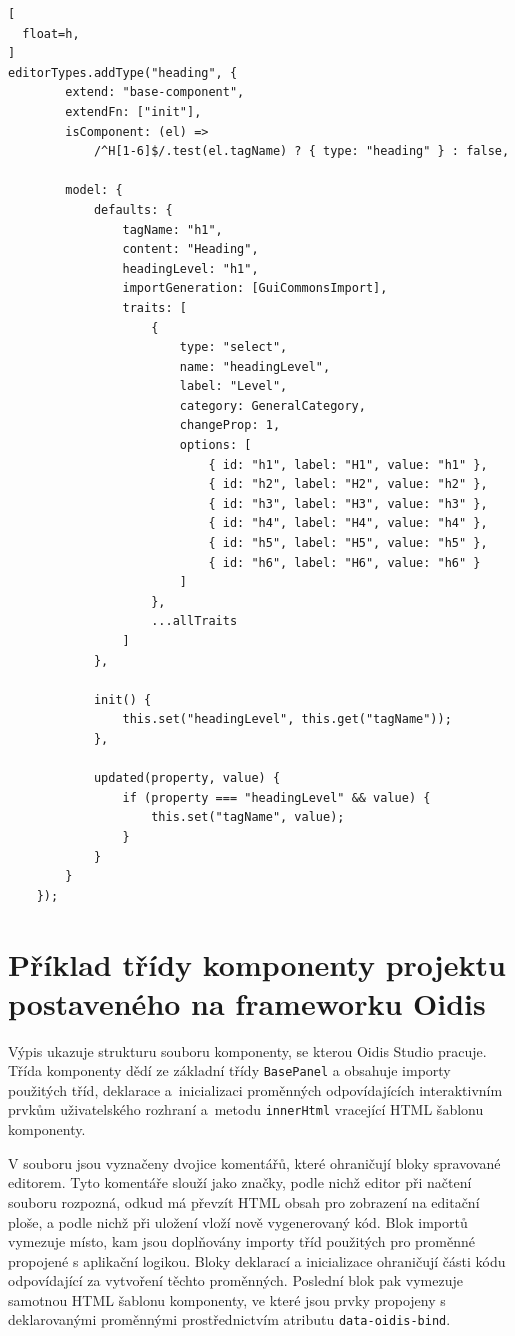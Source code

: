 \begin{lstlisting}[
  float=h,
]
editorTypes.addType("heading", {
        extend: "base-component",
        extendFn: ["init"],
        isComponent: (el) =>
            /^H[1-6]$/.test(el.tagName) ? { type: "heading" } : false,

        model: {
            defaults: {
                tagName: "h1",
                content: "Heading",
                headingLevel: "h1",
                importGeneration: [GuiCommonsImport],
                traits: [
                    {
                        type: "select",
                        name: "headingLevel",
                        label: "Level",
                        category: GeneralCategory,
                        changeProp: 1,
                        options: [
                            { id: "h1", label: "H1", value: "h1" },
                            { id: "h2", label: "H2", value: "h2" },
                            { id: "h3", label: "H3", value: "h3" },
                            { id: "h4", label: "H4", value: "h4" },
                            { id: "h5", label: "H5", value: "h5" },
                            { id: "h6", label: "H6", value: "h6" }
                        ]
                    },
                    ...allTraits
                ]
            },

            init() {
                this.set("headingLevel", this.get("tagName"));
            },

            updated(property, value) {
                if (property === "headingLevel" && value) {
                    this.set("tagName", value);
                }
            }
        }
    });
\end{lstlisting}

\chapter{Příklad třídy komponenty projektu postaveného na frameworku Oidis}
\label{lst:file}

Výpis ukazuje strukturu souboru komponenty, se kterou Oidis Studio pracuje. Třída komponenty dědí ze základní třídy \texttt{BasePanel} a obsahuje importy použitých tříd, deklarace a~inicializaci proměnných odpovídajících interaktivním prvkům uživatelského rozhraní a~metodu \texttt{innerHtml} vracející HTML šablonu komponenty.

V souboru jsou vyznačeny dvojice komentářů, které ohraničují bloky spravované editorem. Tyto komentáře slouží jako značky, podle nichž editor při načtení souboru rozpozná, odkud má převzít HTML obsah pro zobrazení na editační ploše, a podle nichž při uložení vloží nově vygenerovaný kód. Blok importů vymezuje místo, kam jsou doplňovány importy tříd použitých pro proměnné propojené s aplikační logikou. Bloky deklarací a inicializace ohraničují části kódu odpovídající za vytvoření těchto proměnných. Poslední blok pak vymezuje samotnou HTML šablonu komponenty, ve které jsou prvky propojeny s deklarovanými proměnnými prostřednictvím atributu \texttt{data-oidis-bind}.

